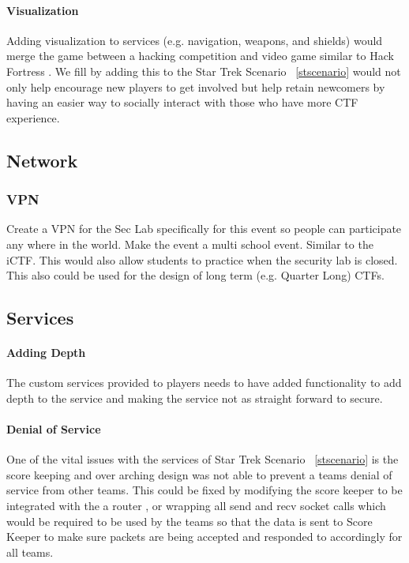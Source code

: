 \documentclass[10pt]{article}
\begin{document}
\paragraph*{Visualization}
Adding visualization to services (e.g. navigation, weapons, and shields) would
merge the game between a hacking competition and video game similar to Hack
Fortress \cite{HackFortress}. We fill by adding this to the Star Trek Scenario
~\ref{stscenario} would not only help encourage new players to get involved but
help retain newcomers by having an easier way to socially interact with those
who have more CTF experience.

\subsection{Network}

\subsubsection{VPN}
Create a VPN for the Sec Lab specifically for this event so people can
participate any where in the world. Make the event a multi school event.
Similar to the iCTF. This would also allow students to practice when the
security lab is closed. This also could be used for the design of long term
(e.g. Quarter Long) CTFs.

\subsection{Services}

\paragraph*{Adding Depth}
The custom services provided to players needs to have added functionality to add depth
to the service and making the service not as straight forward to secure.

\paragraph*{Denial of Service}
One of the vital issues with the services of Star Trek Scenario ~\ref{stscenario} is the
score keeping and over arching design was not able to prevent a teams denial of service
from other teams. This could be fixed by modifying the score keeper to be integrated with
the a router \cite{BlackHat2004}, or wrapping all send and recv socket calls which
would be required to be used by the teams so that the data is sent to Score Keeper 
to make sure packets are being accepted and responded to accordingly for all teams.
\end{document}
